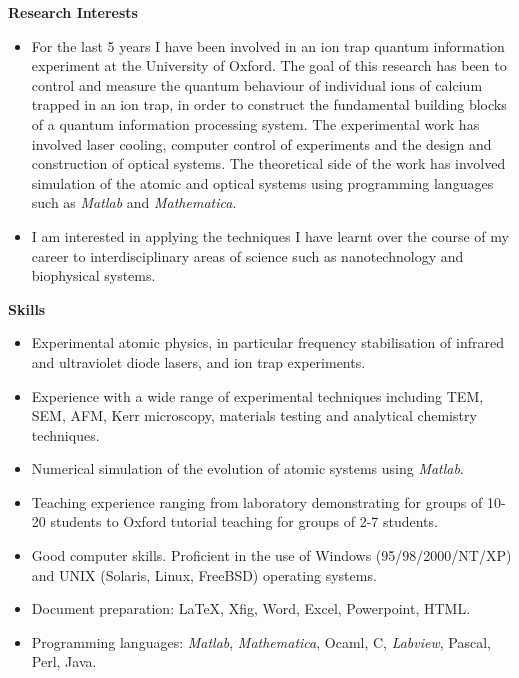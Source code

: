 \documentclass[11pt,a4paper]{article}
\begin{document}
{\large \textbf{Research Interests}}
\begin{itemize}
\item For the last 5 years I have been involved in an ion trap quantum
  information experiment at the University of Oxford.  The goal of
  this research has been to control and measure the quantum behaviour
  of individual ions of calcium trapped in an ion trap, in order to
  construct the fundamental building blocks of a quantum information
  processing system.  The experimental work has involved laser
  cooling, computer control of experiments and the design and
  construction of optical systems.  The theoretical side of the work
  has involved simulation of the atomic and optical systems using
  programming languages such as \textit{Matlab} and \textit{Mathematica}. 
\item I am interested in applying the techniques I have learnt over
  the course of my career to interdisciplinary areas of science 
  such as nanotechnology and biophysical systems.
\end{itemize}

{\large \textbf{Skills}}
\begin{itemize}
  \item Experimental atomic physics, in particular frequency
    stabilisation of infrared and ultraviolet diode lasers, and  
    ion trap experiments. 
  \item Experience with a wide range of experimental techniques including
    TEM, SEM, AFM, Kerr microscopy, materials testing and analytical chemistry
    techniques.
  \item Numerical simulation of the evolution of atomic systems using
    \textit{Matlab}.
   \item Teaching experience ranging from laboratory demonstrating for groups
    of 10-20 students to Oxford tutorial teaching for groups of 
    2-7 students. 
  \item Good computer skills. Proficient in the use of Windows
    (95/98/2000/NT/XP) and UNIX (Solaris, Linux, FreeBSD) operating
    systems.
  \item Document preparation: \LaTeX, Xfig, Word, Excel, Powerpoint,
    HTML.
  \item Programming languages:  \textit{Matlab}, \textit{Mathematica},
    Ocaml, C, \textit{Labview}, Pascal, Perl, Java.
\end{itemize}

\end{document}
